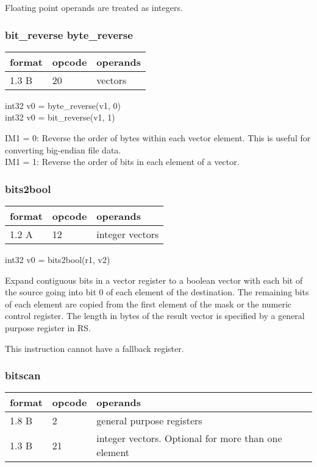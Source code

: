 \documentclass[forwardcom.tex]{subfiles}
\begin{document}
Floating point operands are treated as integers.

\subsubsection{bit\_reverse byte\_reverse}
\label{table:bitReverseInstruction}
\begin{tabular}{|p{12mm}|p{12mm}|p{110mm}|}
\hline
\bfseries format & \bfseries opcode & \bfseries operands \\ \hline
1.3 B & 20 & vectors \\ \hline
\end{tabular}
\vspace{2mm}

int32 v0 = byte\_reverse(v1, 0)\\
int32 v0 = bit\_reverse(v1, 1)
\vspace{2mm}

IM1 = 0: Reverse the order of bytes within each vector element. This is useful for converting big-endian file data.\\
IM1 = 1: Reverse the order of bits in each element of a vector.
\vspace{2mm}


\subsubsection{bits2bool}
\label{table:bits2boolInstruction}
\begin{tabular}{|p{12mm}|p{12mm}|p{110mm}|}
\hline
\bfseries format & \bfseries opcode & \bfseries operands \\ \hline
1.2 A & 12 & integer vectors \\ \hline
\end{tabular}
\vspace{2mm}

int32 v0 = bits2bool(r1, v2)
\vspace{2mm}

Expand contiguous bits in a vector register to a boolean vector with each bit of the source going into bit 0 of each element of the destination. 
The remaining bits of each element are copied from the first element of the mask or the numeric control register.
The length in bytes of the result vector is specified by a general purpose register in RS.
\vspace{2mm}

This instruction cannot have a fallback register.

\subsubsection{bitscan}
\label{table:bitscanInstruction}
\begin{tabular}{|p{12mm}|p{12mm}|p{110mm}|}
\hline
\bfseries format & \bfseries opcode & \bfseries operands \\ \hline
1.8 B &  2 & general purpose registers \\ \hline
1.3 B & 21 & integer vectors. Optional for more than one element \\ \hline
\end{tabular}
\vspace{2mm}
\end{document}
